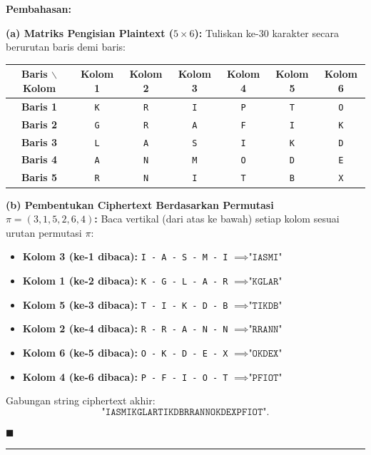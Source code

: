 \documentclass[11pt,a4paper]{article}
\newenvironment{solusi}{\noindent\textbf{\textsf{Pembahasan:}}\par\vspace{0.2em}}{\hfill$\blacksquare$\vspace{1em}\par\hrule\vspace{1em}}
\begin{document}
\begin{solusi}
\textbf{(a) Matriks Pengisian Plaintext ($5 \times 6$):}
Tuliskan ke-30 karakter secara berurutan baris demi baris:
\begin{center}
\begin{tabular}{c | c c c c c c}
\toprule
\textbf{Baris $\backslash$ Kolom} & \textbf{Kolom 1} & \textbf{Kolom 2} & \textbf{Kolom 3} & \textbf{Kolom 4} & \textbf{Kolom 5} & \textbf{Kolom 6} \\
\midrule
\textbf{Baris 1} & \texttt{K} & \texttt{R} & \texttt{I} & \texttt{P} & \texttt{T} & \texttt{O} \\
\textbf{Baris 2} & \texttt{G} & \texttt{R} & \texttt{A} & \texttt{F} & \texttt{I} & \texttt{K} \\
\textbf{Baris 3} & \texttt{L} & \texttt{A} & \texttt{S} & \texttt{I} & \texttt{K} & \texttt{D} \\
\textbf{Baris 4} & \texttt{A} & \texttt{N} & \texttt{M} & \texttt{O} & \texttt{D} & \texttt{E} \\
\textbf{Baris 5} & \texttt{R} & \texttt{N} & \texttt{I} & \texttt{T} & \texttt{B} & \texttt{X} \\
\bottomrule
\end{tabular}
\end{center}

\vspace{0.2cm}
\textbf{(b) Pembentukan Ciphertext Berdasarkan Permutasi $\pi = (3, 1, 5, 2, 6, 4)$:}
Baca vertikal (dari atas ke bawah) setiap kolom sesuai urutan permutasi $\pi$:
\begin{itemize}[leftmargin=*]
    \item \textbf{Kolom 3 (ke-1 dibaca):} \texttt{I - A - S - M - I} $\implies \texttt{"IASMI"}$
    \item \textbf{Kolom 1 (ke-2 dibaca):} \texttt{K - G - L - A - R} $\implies \texttt{"KGLAR"}$
    \item \textbf{Kolom 5 (ke-3 dibaca):} \texttt{T - I - K - D - B} $\implies \texttt{"TIKDB"}$
    \item \textbf{Kolom 2 (ke-4 dibaca):} \texttt{R - R - A - N - N} $\implies \texttt{"RRANN"}$
    \item \textbf{Kolom 6 (ke-5 dibaca):} \texttt{O - K - D - E - X} $\implies \texttt{"OKDEX"}$
    \item \textbf{Kolom 4 (ke-6 dibaca):} \texttt{P - F - I - O - T} $\implies \texttt{"PFIOT"}$
\end{itemize}
Gabungan string ciphertext akhir:
\[
\mathbf{\texttt{"IASMIKGLARTIKDBRRANNOKDEXPFIOT"}}.
\]


\end{solusi}
\end{document}
